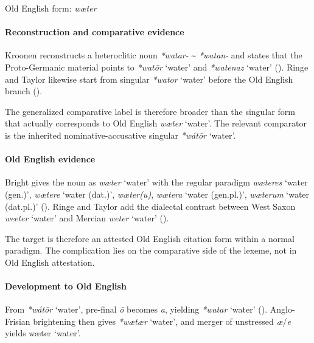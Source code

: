 \documentclass[
  british,
  a4paper,
]{article}
\providecommand{\Recon}[1]{\emph{*#1}}
\begin{document}
Old English form: \emph{wæter}

\paragraph{Reconstruction and comparative
evidence}\label{reconstruction-and-comparative-evidence-111}

Kroonen reconstructs a heteroclitic noun \emph{*watar-}
\textasciitilde{} \emph{*watan-} and states that the Proto-Germanic
material points to \Recon{watōr} `water' and \Recon{watenaz} `water'
(). Ringe and Taylor
likewise start from singular \Recon{wator} `water' before the Old
English branch ().

The generalized comparative label is therefore broader than the singular
form that actually corresponds to Old English {\emph{wæter}} `water'.
The relevant comparator is the inherited nominative-accusative singular
\Recon{wátōr} `water'.

\paragraph{Old English evidence}\label{old-english-evidence-111}

Bright gives the noun as {\emph{wæter}} `water' with the regular
paradigm {\emph{wæteres}} `water (gen.)', {\emph{wætere}} `water
(dat.)', \emph{wæter(u)}, {\emph{wætera}} `water (gen.pl.)',
{\emph{wæterum}} `water (dat.pl.)'
(). Ringe and
Taylor add the dialectal contrast between West Saxon \emph{weeter}
`water' and Mercian \emph{weter} `water'
().

The target is therefore an attested Old English citation form within a
normal paradigm. The complication lies on the comparative side of the
lexeme, not in Old English attestation.

\paragraph{Development to Old
English}\label{development-to-old-english-111}

From \Recon{wátōr} `water', pre-final \emph{ō} becomes \emph{a},
yielding \Recon{watar} `water' (). Anglo-Frisian brightening then gives
\Recon{wætær} `water', and merger of unstressed \emph{æ}/\emph{e} yields
{wæter} `water'.
\end{document}
